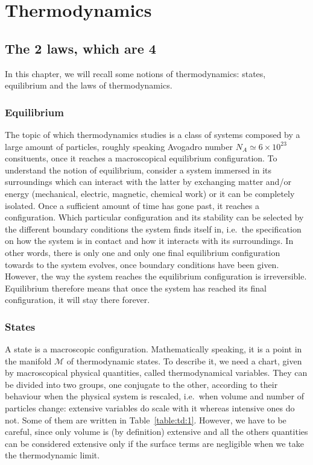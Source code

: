 \part{Thermodynamics}

\chapter{The 2 laws, which are 4}

    In this chapter, we will recall some notions of thermodynamics: states, equilibrium and the laws of thermodynamics.

\section{Equilibrium}

    The topic of which thermodynamics studies is a class of systems composed by a large amount of particles, roughly speaking Avogadro number $N_A \simeq 6 \times 10^{23}$ consituents, once it reaches a macroscopical equilibrium configuration. To understand the notion of equilibrium, consider a system immersed in its surroundings which can interact with the latter by exchanging matter and/or energy (mechanical, electric, magnetic, chemical work) or it can be completely isolated. Once a sufficient amount of time has gone past, it reaches a configuration. Which particular configuration and its stability can be selected by the different boundary conditions the system finds itself in, i.e.~the specification on how the system is in contact and how it interacts with its surroundings. In other words, there is only one and only one final equilibrium configuration towards to the system evolves, once boundary conditions have been given. However, the way the system reaches the equilibrium configuration is irreversible. Equilibrium therefore means that once the system has reached its final configuration, it will stay there forever. 

\section{States}

    A state is a macroscopic configuration. Mathematically speaking, it is a point in the manifold $\mathcal M$ of thermodynamic states. To describe it, we need a chart, given by macroscopical physical quantities, called thermodynamical variables. They can be divided into two groups, one conjugate to the other, according to their behaviour when the physical system is rescaled, i.e.~when volume and number of particles change: extensive variables do scale with it whereas intensive ones do not. Some of them are written in Table~\ref{table:td:1}. However, we have to be careful, since only volume is (by definition) extensive and all the others quantities can be considered extensive only if the surface terms are negligible when we take the thermodynamic limit. 

